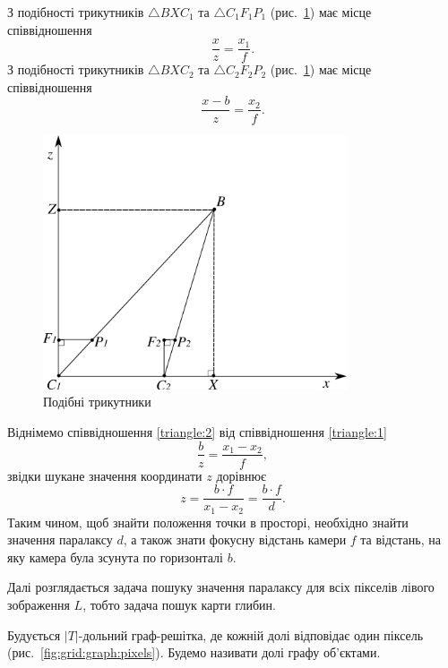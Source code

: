 З подібності трикутників $\triangle BXC_1$ та $\triangle C_1 F_1 P_1$
(рис.~\ref{fig:triangles}) має місце співвідношення
\begin{equation}
    \frac{x}{z} = \frac{x_1}{f}.
\end{equation} \label{triangle:1}
З подібності трикутників $\triangle BXC_2$ та $\triangle C_2 F_2 P_2$
(рис.~\ref{fig:triangles}) має місце співвідношення
\begin{equation} \label{triangle:2}
    \frac{x - b}{z} = \frac{x_2}{f}.
\end{equation}

\begin{figure}[h]
  \centering
  \includegraphics[width=0.8\textwidth]{images/2d_triangles}
  \caption{Подібні трикутники}
  \label{fig:triangles}
\end{figure}

Віднімемо співвідношення \eqref{triangle:2} від співвідношення
\eqref{triangle:1}
\begin{equation*}
    \frac{b}{z} = \frac{x_1 - x_2}{f},
\end{equation*}
звідки шукане значення координати $z$ дорівнює
\begin{equation*}
    z = \frac{b \cdot f}{x_1 - x_2} = \frac{b \cdot f}{d}.
\end{equation*}
Таким чином, щоб знайти положення точки в просторі,
необхідно знайти значення паралаксу $d$,
а також знати фокусну відстань камери $f$ та відстань,
на яку камера була зсунута по горизонталі $b$.

Далі розглядається задача пошуку значення паралаксу для всіх пікселів
лівого зображення $L$, тобто задача пошук карти глибин.

Будується $\left| T \right|$-дольний граф-решітка,
де кожній долі відповідає один піксель (рис.~\ref{fig:grid:graph:pixels}).
Будемо називати долі графу об'єктами.

